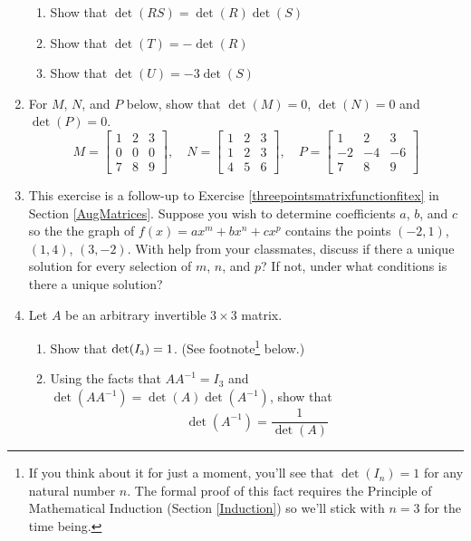 \begin{enumerate}
\begin{enumerate}

\item Show that $\det(RS) = \det(R)\det(S)$
\item Show that $\det(T) = -\det(R)$
\item Show that $\det(U) = -3\det(S)$

\end{enumerate}

\item For $M$,  $N$, and $P$ below, show that $\det(M) = 0$, $\det(N) = 0$ and $\det(P) = 0$. \[M = \left[ \begin{array}{rrr} 1 & 2 & 3 \\ 0 & 0 & 0 \\ 7 & 8 & 9 \end{array} \right], \quad N = \left[ \begin{array}{rrr} 1 & 2 & 3 \\ 1 & 2 & 3 \\ 4 & 5 & 6 \end{array} \right] , \quad  P =  \left[ \begin{array}{rrr} 1 & 2 & 3 \\ -2 & -4 & -6 \\ 7 & 8 & 9 \end{array} \right]  \]

\item  This exercise is a follow-up to Exercise \ref{threepointsmatrixfunctionfitex} in Section \ref{AugMatrices}.   Suppose you wish to determine coefficients $a$, $b$, and $c$ so the the graph of $f(x) = ax^{m} + bx^{n} + cx^{p}$ contains the points  $(-2,1)$, $(1,4)$, $(3,-2)$.  With help from your classmates, discuss if there a unique solution for every selection of $m$, $n$, and $p$?  If not, under what conditions is there a unique solution?

\item Let $A$ be an arbitrary invertible $3 \times 3$ matrix.  

\begin{enumerate}

\item Show that $\det(I_{\mbox{\tiny$3$}}) = 1$. (See footnote\footnote{If you think about it for just a moment, you'll see that $\det(I_{n}) = 1$ for any natural number $n$.  The formal proof of this fact requires the Principle of Mathematical Induction (Section \ref{Induction}) so we'll stick with $n = 3$ for the time being.} below.)

\item Using the facts that $AA^{-1} = I_{3}$ and $\det(AA^{-1}) = \det(A)\det(A^{-1})$, show that \[\det(A^{-1}) = \dfrac{1}{\det(A)}\]

\end{enumerate}

\setcounter{HW}{\value{enumi}}
\end{enumerate}

